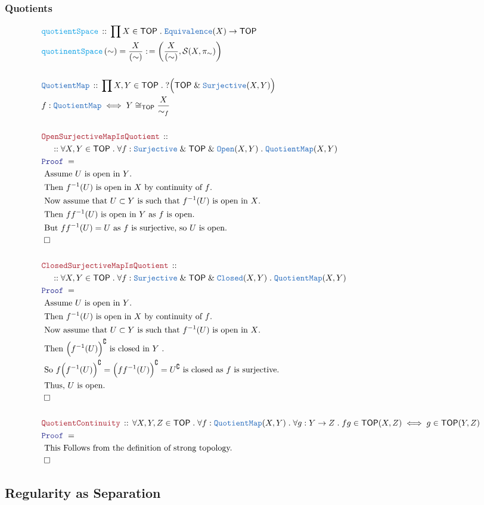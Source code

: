\documentclass[12pt]{scrartcl}
\newcommand{\TYPE}[1]{\textcolor{NavyBlue}{\mathtt{#1}}}
\newcommand{\FUNC}[1]{\textcolor{Cerulean}{\mathtt{#1}}}
\newcommand{\LOGIC}[1]{\textcolor{Blue}{\mathtt{#1}}}
\newcommand{\THM}[1]{\textcolor{Maroon}{\mathtt{#1}}}
\renewcommand{\.}{\; . \;}
\newcommand{\de}{: \kern 0.1pc =}
\newcommand{\Act}[1]{\left( #1 \right)}
\newcommand{\Theorem}[2]{& \THM{#1} \, :: \, #2 \\ & \Proof = \\ }
\newcommand{\DeclareType}[2]{& \TYPE{#1} \, :: \, #2 \\}
\newcommand{\DefineType}[3]{& #1 : \TYPE{#2} \iff #3 \\}
\newcommand{\DeclareFunc}[2]{& \FUNC{#1} \, :: \, #2 \\}
\newcommand{\DefineNamedFunc}[4]{&  \FUNC{#1}\Act{#2} = #3 \de #4 \\}
\newcommand{\NewLine}{\\ & \kern 1pc}
\newcommand{\Page}[1]{ \begin{align*} #1 \end{align*}   }
\newcommand{\Explain}[1]{& \text{#1.} \\}
\renewcommand{\And}{\; \& \;}
\newcommand{\Surj}{\TYPE{Surjective}}
\renewcommand{\c}{\complement}
\newcommand{\QED}{\; \square}
\newcommand{\EndProof}{& \QED \\}
\newcommand{\Proof}{\LOGIC{Proof} \; }
\newcommand{\Closed}{\TYPE{Closed}}
\newcommand{\Open}{\TYPE{Open}}
\newcommand{\QM}{\TYPE{QuotientMap}}
\newcommand{\TOP}{\mathsf{TOP}}
\renewcommand{\S}{\mathcal{S}}
\begin{document}
\subsubsection{Quotients}
\Page{
	\DeclareFunc{quotientSpace}{\prod X \in \TOP \. \TYPE{Equivalence}(X) \to \TOP}
	\DefineNamedFunc{quotinentSpace}{\sim}{\frac{X}{(\sim)}}{
		\Act{\frac{X}{(\sim)}, \S(X,\pi_\sim)}
	}
	\\
	\DeclareType{QuotientMap}{ 
		\prod X,Y \in \TOP \.    ?\Big(\TOP \And \Surj(X,Y)\Big)
	}
	\DefineType{f}{QuotientMap}{Y \cong_\TOP \frac{X}{\sim_f}}
	\\
	\Theorem{OpenSurjectiveMapIsQuotient}
	{
		\NewLine :: 
		\forall X,Y \in \TOP \.
		\forall f : \Surj \And \TOP \And \Open(X,Y) \.
		\QM(X,Y)	
	}
	\Explain{
		Assume $U$ is open in $Y$}
	\Explain{
		Then $f^{-1}(U)$ is open in $X$ by continuity of $f$}
	\Explain{
		Now assume that $U \subset Y$ is such that $f^{-1}(U)$ is open in $X$}
	\Explain{
		Then $ff^{-1}(U)$ is open in $Y$ as $f$ is open}
	\Explain{
		But $ff^{-1}(U)  = U$ as $f$ is surjective,
		so $U$ is open}
	\EndProof
	\\
	\Theorem{ClosedSurjectiveMapIsQuotient}
	{
		\NewLine :: 
		\forall X,Y \in \TOP \.
		\forall f : \Surj \And \TOP \And \Closed(X,Y) \.
		\QM(X,Y)	
	}
	\Explain{
		Assume $U$ is open in $Y$}
	\Explain{
		Then $f^{-1}(U)$ is open in $X$ by continuity of $f$}
	\Explain{
		Now assume that $U \subset Y$ is such that $f^{-1}(U)$ is open in $X$}
	\Explain{
		Then $\Big(f^{-1}(U)\Big)^\c$ is closed in $Y$ }
	\Explain{
		So  $f\Big( f^{-1}(U) \Big)^\c = \Big( ff^{-1}(U)\Big)^\c = U^\c$ is closed
		as $f$ is surjective}
	\Explain{
		Thus, $U$ is open}
	\EndProof
	\\
	\Theorem{QuotientContinuity}
	{
		\forall X,Y,Z \in \TOP \.
		\forall f : \QM(X,Y) \.
		\forall g : Y \to Z \.
		fg \in \TOP(X,Z) \iff g \in \TOP(Y,Z)
	}
	\Explain{ This Follows from the definition of strong topology}
	\EndProof
}
\newpage
\subsection{Regularity as Separation}
\end{document}
